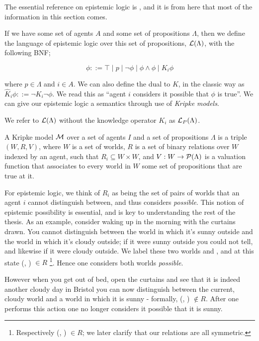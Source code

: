 \documentclass[10pt, a4paper]{report}
\begin{document}
The essential reference on epistemic logic is \cite{ReasoningAboutKnowledge},
and it is from here that most of the information in this section comes.
  
If we have some set of agents $A$ and some set of propositions $\Lambda$, then
we define the language of epistemic logic over this set of propositions,
$\mathcal{L}(\Lambda)$, with the following BNF;

\begin{equation*}
  \phi ::= \top \mid p \mid \neg \phi \mid \phi \land \phi \mid K_i \phi
\end{equation*}

\noindent where $p \in \Lambda$ and $i \in A$. We can also define the dual to
$K$, in the classic way as $\widehat K_i \phi ::= \neg K_i \neg \phi$. We read
this as ``agent $i$ considers it possible that $\phi$ is true''. We can give our
epistemic logic a semantics through use of \emph{Kripke models}.

We refer to $\mathcal{L}(\Lambda)$ without the knowledge operator $K_i$ as
$\mathcal{L}_P(\Lambda)$.

\bigskip

A Kripke model $\mathcal{M}$ over a set of agents $I$ and a set of propositions
$\Lambda$ is a triple $(W, R, V)$, where $W$ is a set of worlds, $R$ is a set of
binary relations over $W$ indexed by an agent, such that $R_i \subseteq W \times
W$, and $V : W \rightarrow \mathcal{P}(\Lambda)$ is a valuation function that
associates to every world in $W$ some set of propositions that are true at it.

For epistemic logic, we think of $R_i$ as being the set of pairs of worlds that
an agent $i$ cannot distinguish between, and thus considers \emph{possible}.
This notion of epistemic possibility is essential, and is key to understanding
the rest of the thesis. As an example, consider waking up in the morning with
the curtains drawn. You cannot distinguish between the world in which it's sunny
outside and the world in which it's cloudy outside; if it were sunny outside you
could not tell, and likewise if it were cloudy outside. We label these two
worlds \Sun and \Cloud, and at this state (\Sun, \Cloud) $\in R$
\footnote{Respectively (\Cloud, \Sun) $\in R$; we later clarify that our
  relations are all symmetric.}. Hence one
considers both worlds \emph{possible}.

However when you get out of bed, open the curtains and see that it is indeed
another cloudy day in Bristol you can now distinguish between the current,
cloudy world and a world in which it is sunny - formally, (\Sun, \Cloud) $\not
\in R$. After one performs this action one no longer considers it possible that
it is sunny.
\end{document}
